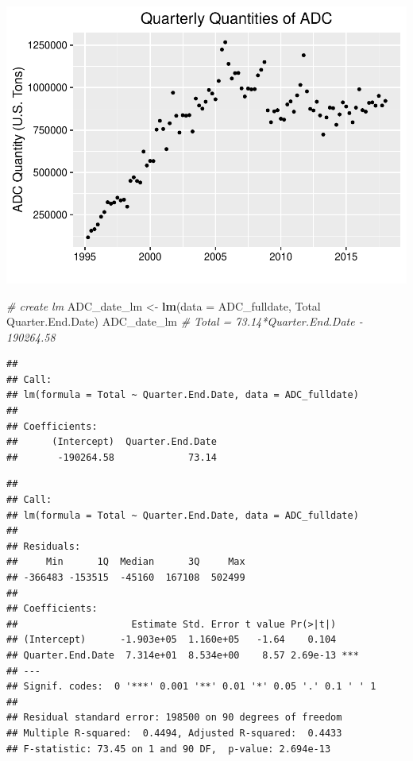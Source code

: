 \documentclass[12pt,]{article}
\newenvironment{Shaded}{\begin{snugshade}}{\end{snugshade}}
\newcommand{\KeywordTok}[1]{\textcolor[rgb]{0.13,0.29,0.53}{\textbf{#1}}}
\newcommand{\DataTypeTok}[1]{\textcolor[rgb]{0.13,0.29,0.53}{#1}}
\newcommand{\StringTok}[1]{\textcolor[rgb]{0.31,0.60,0.02}{#1}}
\newcommand{\CommentTok}[1]{\textcolor[rgb]{0.56,0.35,0.01}{\textit{#1}}}
\newcommand{\OperatorTok}[1]{\textcolor[rgb]{0.81,0.36,0.00}{\textbf{#1}}}
\newcommand{\NormalTok}[1]{#1}
\begin{document}
\includegraphics{SKo_Project_Template_files/figure-latex/Test2_1-1.pdf}

\begin{Shaded}
\begin{Highlighting}[]
\CommentTok{# create lm}
\NormalTok{ADC_date_lm <-}\StringTok{ }\KeywordTok{lm}\NormalTok{(}\DataTypeTok{data =}\NormalTok{ ADC_fulldate, Total }\OperatorTok{~}\StringTok{ }\NormalTok{Quarter.End.Date)}
\NormalTok{ADC_date_lm }\CommentTok{# Total = 73.14*Quarter.End.Date - 190264.58}
\end{Highlighting}
\end{Shaded}

\begin{verbatim}
## 
## Call:
## lm(formula = Total ~ Quarter.End.Date, data = ADC_fulldate)
## 
## Coefficients:
##      (Intercept)  Quarter.End.Date  
##       -190264.58             73.14
\end{verbatim}

\begin{Shaded}
\end{Shaded}

\begin{verbatim}
## 
## Call:
## lm(formula = Total ~ Quarter.End.Date, data = ADC_fulldate)
## 
## Residuals:
##     Min      1Q  Median      3Q     Max 
## -366483 -153515  -45160  167108  502499 
## 
## Coefficients:
##                    Estimate Std. Error t value Pr(>|t|)    
## (Intercept)      -1.903e+05  1.160e+05   -1.64    0.104    
## Quarter.End.Date  7.314e+01  8.534e+00    8.57 2.69e-13 ***
## ---
## Signif. codes:  0 '***' 0.001 '**' 0.01 '*' 0.05 '.' 0.1 ' ' 1
## 
## Residual standard error: 198500 on 90 degrees of freedom
## Multiple R-squared:  0.4494, Adjusted R-squared:  0.4433 
## F-statistic: 73.45 on 1 and 90 DF,  p-value: 2.694e-13
\end{verbatim}
\end{document}
